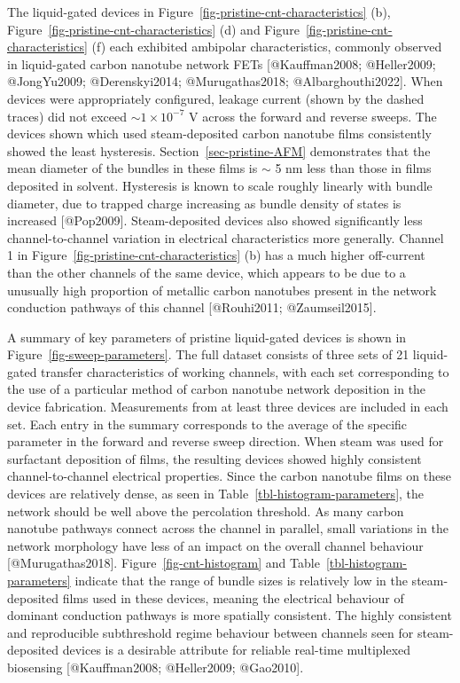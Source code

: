 \documentclass[
  letterpaper,
  DIV=11,
  numbers=noendperiod]{scrartcl}
\begin{document}
The liquid-gated devices in
Figure~\ref{fig-pristine-cnt-characteristics} (b),
Figure~\ref{fig-pristine-cnt-characteristics} (d) and
Figure~\ref{fig-pristine-cnt-characteristics} (f) each exhibited
ambipolar characteristics, commonly observed in liquid-gated carbon
nanotube network FETs {[}@Kauffman2008; @Heller2009; @JongYu2009;
@Derenskyi2014; @Murugathas2018; @Albarghouthi2022{]}. When devices were
appropriately configured, leakage current (shown by the dashed traces)
did not exceed \(\sim 1 \times 10^{-7}\) V across the forward and
reverse sweeps. The devices shown which used steam-deposited carbon
nanotube films consistently showed the least hysteresis.
Section~\ref{sec-pristine-AFM} demonstrates that the mean diameter of
the bundles in these films is \(\sim\) 5 nm less than those in films
deposited in solvent. Hysteresis is known to scale roughly linearly with
bundle diameter, due to trapped charge increasing as bundle density of
states is increased {[}@Pop2009{]}. Steam-deposited devices also showed
significantly less channel-to-channel variation in electrical
characteristics more generally. Channel 1 in
Figure~\ref{fig-pristine-cnt-characteristics} (b) has a much higher
off-current than the other channels of the same device, which appears to
be due to a unusually high proportion of metallic carbon nanotubes
present in the network conduction pathways of this channel
{[}@Rouhi2011; @Zaumseil2015{]}.

A summary of key parameters of pristine liquid-gated devices is shown in
Figure~\ref{fig-sweep-parameters}. The full dataset consists of three
sets of 21 liquid-gated transfer characteristics of working channels,
with each set corresponding to the use of a particular method of carbon
nanotube network deposition in the device fabrication. Measurements from
at least three devices are included in each set. Each entry in the
summary corresponds to the average of the specific parameter in the
forward and reverse sweep direction. When steam was used for surfactant
deposition of films, the resulting devices showed highly consistent
channel-to-channel electrical properties. Since the carbon nanotube
films on these devices are relatively dense, as seen in
Table~\ref{tbl-histogram-parameters}, the network should be well above
the percolation threshold. As many carbon nanotube pathways connect
across the channel in parallel, small variations in the network
morphology have less of an impact on the overall channel behaviour
{[}@Murugathas2018{]}. Figure~\ref{fig-cnt-histogram} and
Table~\ref{tbl-histogram-parameters} indicate that the range of bundle
sizes is relatively low in the steam-deposited films used in these
devices, meaning the electrical behaviour of dominant conduction
pathways is more spatially consistent. The highly consistent and
reproducible subthreshold regime behaviour between channels seen for
steam-deposited devices is a desirable attribute for reliable real-time
multiplexed biosensing {[}@Kauffman2008; @Heller2009; @Gao2010{]}.
\end{document}
